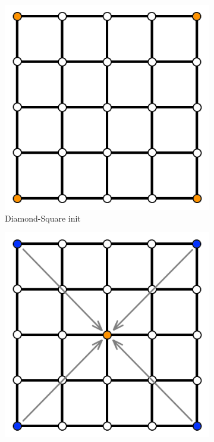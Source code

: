 \documentclass[11pt,a4paper,twoside,openright]{report}
\begin{document}
\begin{figure}[H]
  \centering
  \begin{subfigure}[b]{0.25\textwidth}
    \includegraphics[width=\textwidth]{ds1.png}
    \caption{Diamond-Square init}
    \label{fig:ds1}
  \end{subfigure}
  \begin{subfigure}[b]{0.25\textwidth}
    \includegraphics[width=\textwidth]{ds2.png}

\end{subfigure}
\end{figure}
\end{document}
